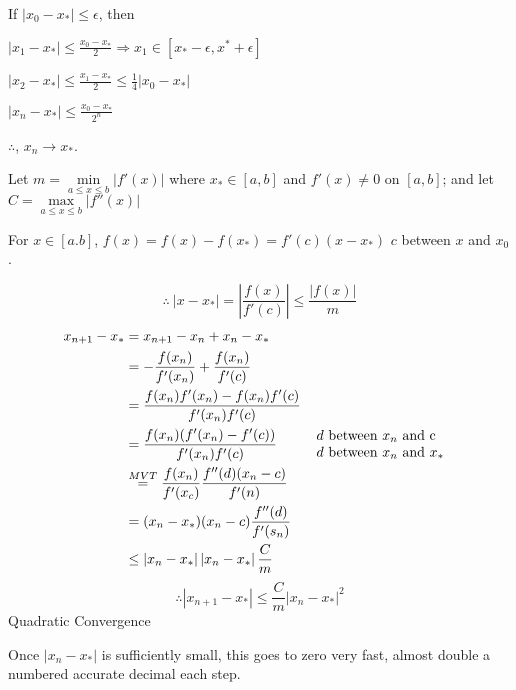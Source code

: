 \documentclass[12pt]{article}
\newcommand{\abs}[1]{\left| #1 \right|}
\theoremstyle{plain}
\begin{document}
	If $\abs{x_0-x_*}\leq \epsilon$, then 
	\begin{description}
		\item $\abs{x_1-x_*} \leq \frac{x_0-x_*}2
			\Rightarrow x_1\in [x_*-\epsilon, x^*+\epsilon]$
		\item $\abs{x_2-x_*} \leq \frac{x_1-x_*}2 \leq \frac14 \abs{x_0-x_*}$
		\item $\abs{x_n-x_*} \leq \frac{x_0-x_*}{2^n}$
	\end{description}

	$\therefore$, $x_n\to x_*$.

	Let $m = \underset{a\leq x\leq b}{\min}\abs{f'(x)}$ 
	where $x_* \in [a,b]$ and $f'(x) \neq 0$ on $[ a , b ]$;
	and let $C=\underset{a\leq x \leq b}{\max} \abs{f''(x)}$ 

	For $x \in [a.b]$, $f(x) = f(x) - f(x_*) = f'(c)(x-x_*)$ 
	$c$ between $x$ and $x_0$ . 

	\[
		\therefore \ \abs{x-x_*} =\abs{ \frac{f(x)}{f'(c)}} \leq \frac{\abs{f(x)}}m
	\]
	\begin{align*}
		x_{n+1}-x_* 
		&= x_{n+1}-x_n + x_n -x_*\\
		&= -\frac{f(x_n)}{f'(x_n)}+\frac{f(x_n)}{f'(c)}\\
		&= \frac{f(x_n)f'(x_n)-f(x_n)f'(c)}{f'(x_n)f'(c)}\\
		&= \frac{f(x_n)(f'(x_n)-f'(c))}{f'(x_n) f'(c)} 
		\tag*{
		$
		\begin{array}{l}
		 	\text{$d$ between $x_n$ and c} \\ 
		 	\text{$d$ between $x_n$ and $x_*$}
		\end{array}
		$
	  }\\ 
		&\overset{MVT}{=} \frac{f(x_n)}{f'(x_c)}\frac{f''(d)(x_n-c)}{f'(n)}
		\\
		&= (x_n-x_*)(x_n-c)\frac{f''(d)}{f'(s_n)} \\
		&\leq \abs{x_n-x_*}\abs{x_n-x_*} \frac Cm
	\end{align*}
	\[
		\therefore \abs{x_{n+1}-x_*} \leq \frac Cm \abs{x_n-x_*}^2
	\]
	Quadratic Convergence
	
	Once $\abs{x_n-x_*}$ is sufficiently small, this goes to zero very fast,
	almost double a numbered accurate decimal each step.
\end{document}
